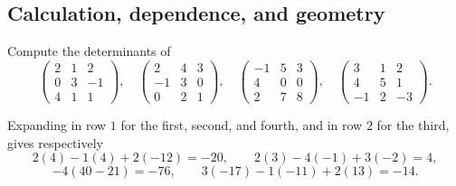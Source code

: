 \subsection*{Calculation, dependence, and geometry}

\begin{problem}\label{ex:07:three}
Compute the determinants of
\[
 \begin{pmatrix}2&1&2\\0&3&-1\\4&1&1\end{pmatrix},\quad
 \begin{pmatrix}2&4&3\\-1&3&0\\0&2&1\end{pmatrix},\quad
 \begin{pmatrix}-1&5&3\\4&0&0\\2&7&8\end{pmatrix},\quad
 \begin{pmatrix}3&1&2\\4&5&1\\-1&2&-3\end{pmatrix}.
\]
\end{problem}
\begin{solution}
Expanding in row \(1\) for the first, second, and fourth, and in row \(2\)
for the third, gives respectively
\[
 2(4)-1(4)+2(-12)=-20,\qquad 2(3)-4(-1)+3(-2)=4,
\]
\[
 -4(40-21)=-76,\qquad 3(-17)-1(-11)+2(13)=-14.
\]
\end{solution}

